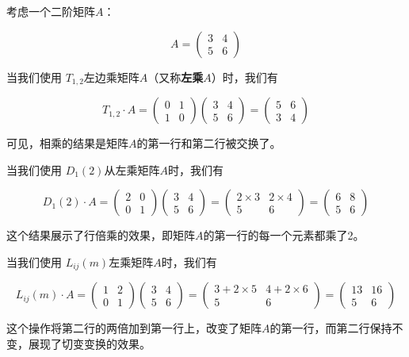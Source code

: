 \begin{exercise}
考虑一个二阶矩阵\(A\)：

\[ A = \begin{pmatrix} 3 & 4 \\ 5 & 6 \end{pmatrix} \]

当我们使用 $T_{1,2} $左边乘矩阵\(A\)（又称\textbf{左乘}\(A\)）时，我们有

\[ T_{1,2} \cdot A = \begin{pmatrix} 0 & 1 \\ 1 & 0 \end{pmatrix} \begin{pmatrix} 3 & 4 \\ 5 & 6 \end{pmatrix} = \begin{pmatrix} 5 & 6 \\ 3 & 4 \end{pmatrix} \]

可见，相乘的结果是矩阵\(A\)的第一行和第二行被交换了。

当我们使用 $D_{1}(2) $从左乘矩阵\(A\)时，我们有

\[ D_{1}(2) \cdot A = \begin{pmatrix} 2 & 0 \\ 0 & 1 \end{pmatrix} \begin{pmatrix} 3 & 4 \\ 5 & 6 \end{pmatrix} = \begin{pmatrix} 2 \times 3 & 2 \times 4 \\ 5 & 6 \end{pmatrix} = \begin{pmatrix} 6 & 8 \\ 5 & 6 \end{pmatrix} \]

这个结果展示了行倍乘的效果，即矩阵\(A\)的第一行的每一个元素都乘了2。

当我们使用 $L_{ij}(m) $左乘矩阵\(A\)时，我们有

\[ L_{ij}(m) \cdot A = \begin{pmatrix} 1 & 2 \\ 0 & 1 \end{pmatrix} \begin{pmatrix} 3 & 4 \\ 5 & 6 \end{pmatrix} = \begin{pmatrix} 3 + 2 \times 5 & 4 + 2 \times 6 \\ 5 & 6 \end{pmatrix} = \begin{pmatrix} 13 & 16 \\ 5 & 6 \end{pmatrix} \]

这个操作将第二行的两倍加到第一行上，改变了矩阵\(A\)的第一行，而第二行保持不变，展现了切变变换的效果。

\end{exercise}

